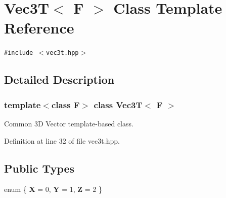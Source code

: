 \section{Vec3T$<$ F $>$ Class Template Reference}
\label{classVec3T}
{\tt \#include $<$vec3t.hpp$>$}



\subsection{Detailed Description}
\subsubsection*{template$<$class F$>$ class Vec3T$<$ F $>$}

Common 3D Vector template-based class. 



Definition at line 32 of file vec3t.hpp.\subsection*{Public Types}
\begin{CompactItemize}
\item 
enum \{ {\bf X} = 0, 
{\bf Y} = 1, 
{\bf Z} = 2
 \}
\end{CompactItemize}
